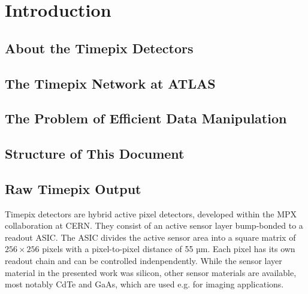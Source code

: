 \chapter{Introduction}

\section{About the Timepix Detectors}

\section{The Timepix Network at ATLAS}

\section{The Problem of Efficient Data Manipulation}

\section{Structure of This Document}





\section{Raw Timepix Output}
Timepix detectors are hybrid active pixel detectors, developed within the MPX collaboration at CERN. They consist of an active sensor layer bump-bonded to a readout ASIC. The ASIC divides the active sensor area into a square matrix of $256 \times 256$ pixels with a pixel-to-pixel distance of 55 µm. Each pixel has its own readout chain and can be controlled indenpendently. While the sensor layer material in the presented work was silicon, other sensor materials are available, most notably CdTe and GaAs, which are used e.g. for imaging applications.


